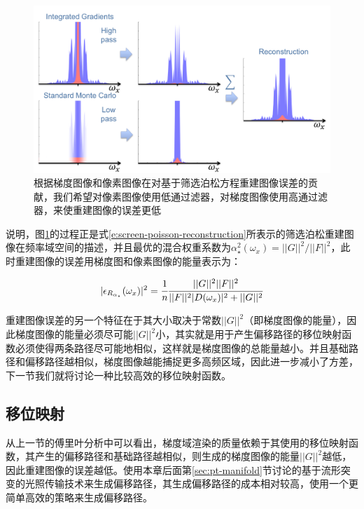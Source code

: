 \begin{figure}
	\includegraphics[width=1.\textwidth]{figures/pt/screen-poisson-reconstruction}
	\caption{根据梯度图像和像素图像在对基于筛选泊松方程重建图像误差的贡献，我们希望对像素图像使用低通过滤器，对梯度图像使用高通过滤器，来使重建图像的误差更低}
	\label{f:pt-screen-poisson-reconstruction}
\end{figure}

\cite{a:GradientDomainPathTracing}说明，图\ref{f:pt-screen-poisson-reconstruction}的过程正是式\ref{e:screen-poisson-reconstruction}所表示的筛选泊松重建图像在频率域空间的描述，并且最优的混合权重系数为$\alpha^{2}_{\star}(\omega_x)=||G||^2/||F||^2$，此时重建图像的误差用梯度图和像素图像的能量表示为：

\begin{equation}
	|\epsilon_{R_{\alpha_{\star}}}(\omega_x)|^2= \cfrac{1}{n} \cfrac{||G||^2 ||F||^2}{||F||^2|D(\omega_x)|^2+||G||^2}
\end{equation}

\noindent 重建图像误差的另一个特征在于其大小取决于常数$||G||^2$（即梯度图像的能量），因此梯度图像的能量必须尽可能$||G||^2$小，其实就是用于产生偏移路径的移位映射函数必须使得两条路径尽可能地相似，这样就是梯度图像的总能量越小。并且基础路径和偏移路径越相似，梯度图像越能捕捉更多高频区域，因此进一步减小了方差，下一节我们就将讨论一种比较高效的移位映射函数。





\subsection{移位映射}\label{sec:pt-gradient-mapping}
从上一节的傅里叶分析中可以看出，梯度域渲染的质量依赖于其使用的移位映射函数，其产生的偏移路径和基础路径越相似，则生成的梯度图像的能量$||G||^2$越低，因此重建图像的误差越低。\cite{a:GradientDomainMetropolisLightTransport,a:ImprovedSamplingforGradientDomainMetropolisLightTransport}使用本章后面第\ref{sec:pt-manifold}节讨论的基于流形突变的光照传输技术来生成偏移路径，其生成偏移路径的成本相对较高，\cite{a:GradientDomainPathTracing}使用一个更简单高效的策略来生成偏移路径。

